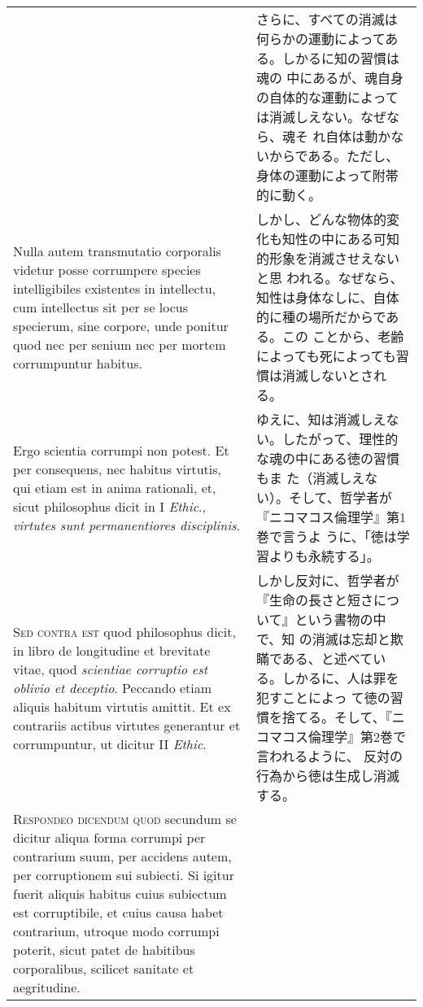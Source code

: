 \documentclass[10pt]{jsarticle} %
\begin{document}
\begin{longtable}{p{21em}p{21em}}
&

さらに、すべての消滅は何らかの運動によってある。しかるに知の習慣は魂の
中にあるが、魂自身の自体的な運動によっては消滅しえない。なぜなら、魂そ
れ自体は動かないからである。ただし、身体の運動によって附帯的に動く。


\\


Nulla autem transmutatio corporalis videtur posse corrumpere species
intelligibiles existentes in intellectu, cum intellectus sit per se
locus specierum, sine corpore, unde ponitur quod nec per senium nec
per mortem corrumpuntur habitus.

&

しかし、どんな物体的変化も知性の中にある可知的形象を消滅させえないと思
われる。なぜなら、知性は身体なしに、自体的に種の場所だからである。この
ことから、老齢によっても死によっても習慣は消滅しないとされる。

\\


Ergo scientia corrumpi non potest. Et per consequens, nec habitus
virtutis, qui etiam est in anima rationali, et, sicut philosophus
dicit in I {\itshape Ethic}., {\itshape virtutes sunt permanentiores
disciplinis}.


&


ゆえに、知は消滅しえない。したがって、理性的な魂の中にある徳の習慣もま
た（消滅しえない）。そして、哲学者が『ニコマコス倫理学』第1巻で言うよ
うに、「徳は学習よりも永続する」。

\\



{\scshape Sed contra est} quod philosophus dicit, in libro de
longitudine et brevitate vitae, quod {\itshape scientiae corruptio est
oblivio et deceptio}. Peccando etiam aliquis habitum virtutis
amittit. Et ex contrariis actibus virtutes generantur et corrumpuntur,
ut dicitur II {\itshape Ethic}.


&

しかし反対に、哲学者が『生命の長さと短さについて』という書物の中で、知
の消滅は忘却と欺瞞である、と述べている。しかるに、人は罪を犯すことによっ
て徳の習慣を捨てる。そして、『ニコマコス倫理学』第2巻で言われるように、
反対の行為から徳は生成し消滅する。


\\

{\scshape Respondeo dicendum quod} secundum se dicitur aliqua forma
corrumpi per contrarium suum, per accidens autem, per corruptionem sui
subiecti. Si igitur fuerit aliquis habitus cuius subiectum est
corruptibile, et cuius causa habet contrarium, utroque modo corrumpi
poterit, sicut patet de habitibus corporalibus, scilicet sanitate et
aegritudine.



\end{longtable}
\end{document}
